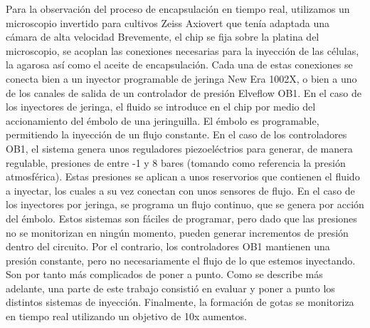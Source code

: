 Para la observación del proceso de encapsulación en tiempo real, utilizamos un microscopio invertido para cultivos Zeiss Axiovert que tenía adaptada una cámara de alta velocidad %
Brevemente, el chip se fija sobre la platina del microscopio, se acoplan las conexiones necesarias para la inyección de las células, la agarosa así como el aceite de encapsulación.
Cada una de estas conexiones se conecta bien a un inyector programable de jeringa New Era 1002X, o bien a uno de los canales de salida de un controlador de presión Elveflow OB1. En el caso de los inyectores de jeringa, el fluido se introduce en el chip por medio del accionamiento del émbolo de una jeringuilla. El émbolo es programable, permitiendo la inyección de un flujo constante. En el caso de los controladores OB1, el sistema genera unos reguladores piezoeléctrios para generar, de manera regulable, presiones de entre -1 y 8 bares (tomando como referencia la presión atmosférica). Estas presiones se aplican a unos reservorios que contienen el fluido a inyectar, los cuales a su vez conectan con unos sensores de flujo. En el caso de los inyectores por jeringa, se programa un flujo continuo, que se genera por acción del émbolo. Estos sistemas son fáciles de programar, pero dado que las presiones no se monitorizan en ningún momento, pueden generar incrementos de presión dentro del circuito. Por el contrario, los controladores OB1 mantienen una presión constante, pero no necesariamente el flujo de lo que estemos inyectando. Son por tanto más complicados de poner a punto. Como se describe más adelante, una parte de este trabajo consistió en evaluar y poner a punto los distintos sistemas de inyección. Finalmente, la formación de gotas se monitoriza en tiempo real utilizando un objetivo de 10x aumentos. %

